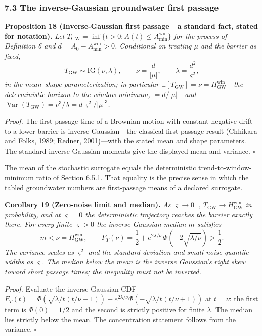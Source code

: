 \documentclass[11pt]{article}
\begin{document}
\subsubsection{7.3 The inverse-Gaussian groundwater first
passage}\label{the-inverse-gaussian-groundwater-first-passage}

\textbf{Proposition 18 (Inverse-Gaussian first passage---a standard
fact, stated for notation).} \emph{Let
\(T_{\mathrm{GW}} = \inf\{ t > 0 : A(t) \le A_{\min}^{\mathrm{win}} \}\)
for the process of Definition 6 and
\(d = A_0 - A_{\min}^{\mathrm{win}} > 0\). Conditional on treating
\(\mu\) and the barrier as fixed,}
\[T_{\mathrm{GW}} \sim \mathrm{IG}(\nu, \lambda), \qquad \nu = \frac{d}{|\mu|}, \qquad \lambda = \frac{d^2}{\varsigma^2},\]
\emph{in the mean--shape parameterization; in particular
\(\mathbb{E}[T_{\mathrm{GW}}] = \nu = H^{\mathrm{win}}_{\mathrm{GW}}\)---the deterministic horizon to the window minimum, \(= d/|\mu|\)---and
\(\operatorname{Var}(T_{\mathrm{GW}}) = \nu^3/\lambda = d\,\varsigma^2/|\mu|^3\).}

\emph{Proof.} The first-passage time of a Brownian motion with constant negative drift to a lower barrier is inverse Gaussian---the classical first-passage result (Chhikara and Folks, 1989; Redner, 2001)---with the stated mean and shape parameters. The standard inverse-Gaussian moments give the displayed mean and variance. \ensuremath{\square}

The mean of the stochastic surrogate equals the deterministic trend-to-window-minimum ratio of Section 6.5.1. That equality is the precise sense in which the tabled groundwater numbers are first-passage means of a declared surrogate.

\textbf{Corollary 19 (Zero-noise limit and median).} \emph{As
\(\varsigma \to 0^+\),
\(T_{\mathrm{GW}} \to H^{\mathrm{win}}_{\mathrm{GW}}\) in probability,
and at \(\varsigma = 0\) the deterministic trajectory reaches the
barrier exactly there. For every finite \(\varsigma > 0\) the
inverse-Gaussian median \(m\) satisfies}
\[m < \nu = H^{\mathrm{win}}_{\mathrm{GW}}, \qquad F_T(\nu) = \frac{1}{2} + e^{2\lambda/\nu}\,\Phi\!\left( -2\sqrt{\lambda/\nu} \right) > \frac{1}{2}.\]
\emph{The variance scales as \(\varsigma^2\) and the standard deviation
and small-noise quantile widths as \(\varsigma\). The median below the
mean is the inverse Gaussian's right skew toward short passage times;
the inequality must not be inverted.}

\emph{Proof.} Evaluate the inverse-Gaussian CDF \(F_T(t) = \Phi(\sqrt{\lambda/\allowbreak{}t}(t/\nu - 1)) + e^{2\lambda/\nu}\Phi(-\sqrt{\lambda/\allowbreak{}t}(t/\nu + 1))\) at \(t = \nu\): the first term is \(\Phi(0) = 1/\allowbreak{}2\) and the second is strictly positive for finite \(\lambda\). The median lies strictly below the mean. The concentration statement follows from the variance. \ensuremath{\square}
\end{document}
